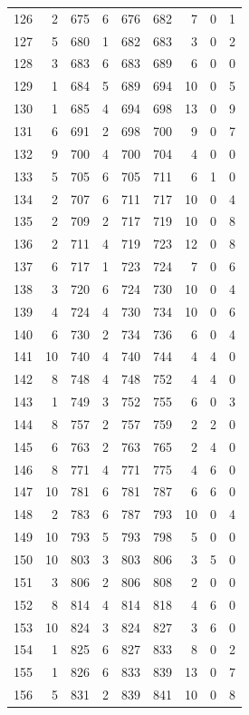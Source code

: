 \begin{longtable}{@{}rrrrrrrrr@{}}
126 & 2 & 675 & 6 & 676 & 682 & 7 & 0 & 1 \\
127 & 5 & 680 & 1 & 682 & 683 & 3 & 0 & 2 \\
128 & 3 & 683 & 6 & 683 & 689 & 6 & 0 & 0 \\
129 & 1 & 684 & 5 & 689 & 694 & 10 & 0 & 5 \\
130 & 1 & 685 & 4 & 694 & 698 & 13 & 0 & 9 \\
131 & 6 & 691 & 2 & 698 & 700 & 9 & 0 & 7 \\
132 & 9 & 700 & 4 & 700 & 704 & 4 & 0 & 0 \\
133 & 5 & 705 & 6 & 705 & 711 & 6 & 1 & 0 \\
134 & 2 & 707 & 6 & 711 & 717 & 10 & 0 & 4 \\
135 & 2 & 709 & 2 & 717 & 719 & 10 & 0 & 8 \\
136 & 2 & 711 & 4 & 719 & 723 & 12 & 0 & 8 \\
137 & 6 & 717 & 1 & 723 & 724 & 7 & 0 & 6 \\
138 & 3 & 720 & 6 & 724 & 730 & 10 & 0 & 4 \\
139 & 4 & 724 & 4 & 730 & 734 & 10 & 0 & 6 \\
140 & 6 & 730 & 2 & 734 & 736 & 6 & 0 & 4 \\
141 & 10 & 740 & 4 & 740 & 744 & 4 & 4 & 0 \\
142 & 8 & 748 & 4 & 748 & 752 & 4 & 4 & 0 \\
143 & 1 & 749 & 3 & 752 & 755 & 6 & 0 & 3 \\
144 & 8 & 757 & 2 & 757 & 759 & 2 & 2 & 0 \\
145 & 6 & 763 & 2 & 763 & 765 & 2 & 4 & 0 \\
146 & 8 & 771 & 4 & 771 & 775 & 4 & 6 & 0 \\
147 & 10 & 781 & 6 & 781 & 787 & 6 & 6 & 0 \\
148 & 2 & 783 & 6 & 787 & 793 & 10 & 0 & 4 \\
149 & 10 & 793 & 5 & 793 & 798 & 5 & 0 & 0 \\
150 & 10 & 803 & 3 & 803 & 806 & 3 & 5 & 0 \\
151 & 3 & 806 & 2 & 806 & 808 & 2 & 0 & 0 \\
152 & 8 & 814 & 4 & 814 & 818 & 4 & 6 & 0 \\
153 & 10 & 824 & 3 & 824 & 827 & 3 & 6 & 0 \\
154 & 1 & 825 & 6 & 827 & 833 & 8 & 0 & 2 \\
155 & 1 & 826 & 6 & 833 & 839 & 13 & 0 & 7 \\
156 & 5 & 831 & 2 & 839 & 841 & 10 & 0 & 8 \\

\end{longtable}
